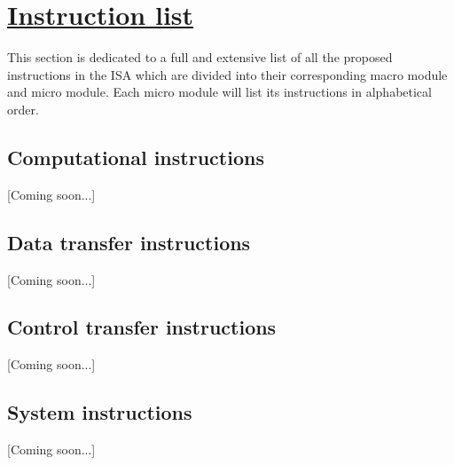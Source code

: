 \section[Instruction list]{\LARGE\underline{Instruction list}}

    \vspace{10pt}

    This section is dedicated to a full and extensive list of all the proposed instructions in the ISA which are divided into their corresponding macro module and micro module. Each micro module will list its instructions in alphabetical order.

    \subsection{Computational instructions}

        [Coming soon...]

    \subsection{Data transfer instructions}

        [Coming soon...]

    \subsection{Control transfer instructions}

        [Coming soon...]

    \subsection{System instructions}

        [Coming soon...]